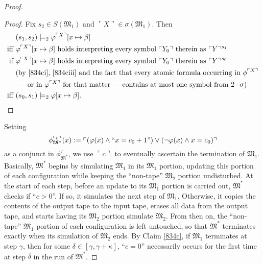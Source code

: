 \documentclass[12pt]{article}
\numberwithin{equation}{section}
\begin{document}
\begin{proof}
\begin{proof}
Fix $s_2 \in S(\mathfrak{M}_1)$ and $\ulcorner X \urcorner \in \sigma(\mathfrak{M}_1)$. Then 
\begin{align*}
    & (s_1, s_2) \models_2 \varphi^{\ulcorner X \urcorner}[x \mapsto \beta] \\
    \text{iff } & \varphi^{\ulcorner X \urcorner}[x \mapsto \beta] \text{ holds interpreting every symbol } \ulcorner Y_0 \urcorner \text{ therein as } \ulcorner Y \urcorner^{s_1} \\
    \text{if } & \varphi^{\ulcorner X \urcorner}[x \mapsto \beta] \text{ holds interpreting every symbol } \ulcorner Y_0 \urcorner \text{ therein as } \ulcorner Y \urcorner^{s_0} \\
    & \text{(by \ref{834ci}, \ref{834ciii} and the fact that every atomic formula occurring in } \phi^{\ulcorner X \urcorner} \\
    & \text{ --- or in } \varphi^{\ulcorner X \urcorner} \text{ for that matter --- contains at most one symbol from } 2 \cdot \sigma \text{)} \\
    \text{iff } & (s_0, s_1) \models_2 \varphi[x \mapsto \beta] \text{.} \qedhere
\end{align*}
\end{proof}

Setting
\begin{equation*}
    \phi^{\ulcorner c \urcorner}_{\mathfrak{M}^*}(x) := \ulcorner (\varphi(x) \wedge ``x = c_0 + 1") \vee (\neg \varphi(x) \wedge x = c_0) \urcorner 
\end{equation*}
as a conjunct in $\phi^{\tau}_{\mathfrak{M}^*}$, we use $\ulcorner c \urcorner$ to eventually ascertain the termination  of $\mathfrak{M}_1$. Basically, $\mathfrak{M}^*$ begins by simulating $\mathfrak{M}_1$ in its $\mathfrak{M}_1$ portion, updating this portion of each configuration while keeping the ``non-tape'' $\mathfrak{M}_2$ portion undisturbed. At the start of each step, before an update to its $\mathfrak{M}_1$ portion is carried out, $\mathfrak{M}^*$ checks if ``$c > 0$''. If so, it simulates the next step of $\mathfrak{M}_1$. Otherwise, it copies the contents of the output tape to the input tape, erases all data from the output tape, and starts having its $\mathfrak{M}_2$ portion simulate $\mathfrak{M}_2$. From then on, the ``non-tape'' $\mathfrak{M}_1$ portion of each configuration is left untouched, so that $\mathfrak{M}^*$ terminates exactly when its simulation of $\mathfrak{M}_2$ ends. By Claim \ref{834c}, if $\mathfrak{M}_1$ terminates at step $\gamma$, then for some $\delta \in [\gamma, \gamma + \kappa]$, ``$c = 0$'' necessarily occurs for the first time at step $\delta$ in the run of $\mathfrak{M}^*$.
\end{proof}
\end{document}
